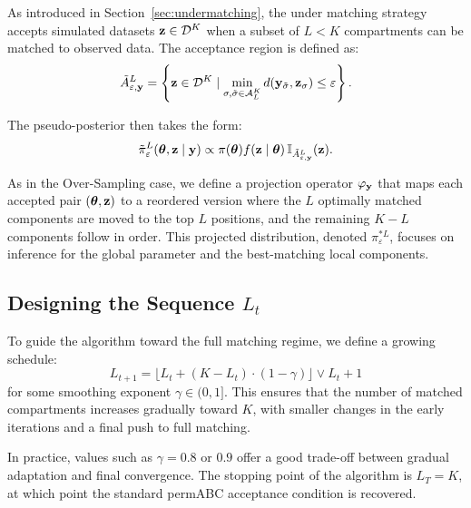 As introduced in Section~\ref{sec:undermatching}, the under matching strategy accepts simulated datasets \( \mathbf{z} \in \mathcal{D}^K \) when a subset of \( L < K \) compartments can be matched to observed data. The acceptance region is defined as:
\[
\tilde A_{\varepsilon, \mathbf{y}}^{L} = \left\{ \mathbf{z} \in \mathcal{D}^K \mid \min_{\sigma, \tilde{\sigma} \in \mathcal A_L^K} d(\mathbf{y}_{\tilde \sigma}, \mathbf{z}_\sigma) \leq \varepsilon \right\}.
\]

The pseudo-posterior then takes the form:
\[
\tilde{\pi}_\varepsilon^L(\boldsymbol{\theta}, \mathbf{z} \mid \mathbf{y}) \propto \pi(\boldsymbol{\theta}) f(\mathbf{z} \mid \boldsymbol{\theta}) \, \mathbb{I}_{\tilde A_{\varepsilon, \mathbf{y}}^{L}}(\mathbf{z}).
\]

As in the Over-Sampling case, we define a projection operator \( \varphi_{\mathbf{y}} \) that maps each accepted pair \( (\boldsymbol{\theta}, \mathbf{z}) \) to a reordered version where the \( L \) optimally matched components are moved to the top \( L \) positions, and the remaining \( K - L \) components follow in order. This projected distribution, denoted \( \pi^{*L}_\varepsilon \), focuses on inference for the global parameter and the best-matching local components.

\subsection{Designing the Sequence \( L_t \)}

To guide the algorithm toward the full matching regime, we define a growing schedule:
\[
L_{t+1} = \lfloor L_t + (K - L_t) \cdot (1-\gamma) \rfloor \vee L_t + 1
\]
for some smoothing exponent \( \gamma \in (0, 1] \). This ensures that the number of matched compartments increases gradually toward \( K \), with smaller changes in the early iterations and a final push to full matching.

In practice, values such as \( \gamma = 0.8 \) or \( 0.9 \) offer a good trade-off between gradual adaptation and final convergence. The stopping point of the algorithm is \( L_T = K \), at which point the standard permABC acceptance condition is recovered.




